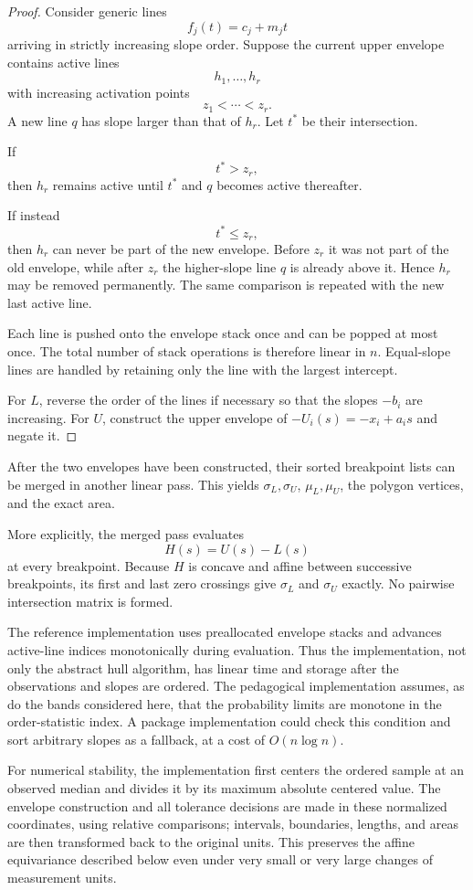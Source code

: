 \documentclass[11pt]{article}
\begin{document}
\begin{proof}
Consider generic lines
\[
    f_j(t)=c_j+m_jt
\]
arriving in strictly increasing slope order.  Suppose the current upper
envelope contains active lines
\[
    h_1,\ldots,h_r
\]
with increasing activation points
\[
    z_1<\cdots<z_r.
\]
A new line $q$ has slope larger than that of $h_r$.  Let $t^\ast$ be
their intersection.

If
\[
    t^\ast>z_r,
\]
then $h_r$ remains active until $t^\ast$ and $q$ becomes active
thereafter.

If instead
\[
    t^\ast\leq z_r,
\]
then $h_r$ can never be part of the new envelope.  Before $z_r$ it was
not part of the old envelope, while after $z_r$ the higher-slope line
$q$ is already above it.  Hence $h_r$ may be removed permanently.  The
same comparison is repeated with the new last active line.

Each line is pushed onto the envelope stack once and can be popped at
most once.  The total number of stack operations is therefore linear in
$n$.  Equal-slope lines are handled by retaining only the line with the
largest intercept.

For $L$, reverse the order of the lines if necessary so that the slopes
$-b_i$ are increasing.  For $U$, construct the upper envelope of
$-U_i(s)=-x_i+a_i s$ and negate it.
\end{proof}

After the two envelopes have been constructed, their sorted breakpoint
lists can be merged in another linear pass.  This yields
$\sigma_L,\sigma_U$, $\mu_L,\mu_U$, the polygon vertices, and the exact
area.

More explicitly, the merged pass evaluates
\[
    H(s)=U(s)-L(s)
\]
at every breakpoint.  Because $H$ is concave and affine between
successive breakpoints, its first and last zero crossings give
$\sigma_L$ and $\sigma_U$ exactly.  No pairwise intersection matrix is
formed.

The reference implementation uses preallocated envelope stacks and
advances active-line indices monotonically during evaluation.  Thus the
implementation, not only the abstract hull algorithm, has linear time
and storage after the observations and slopes are ordered.  The
pedagogical implementation assumes, as do the bands considered here,
that the probability limits are monotone in the order-statistic index.
A package implementation could check this condition and sort arbitrary
slopes as a fallback, at a cost of $O(n\log n)$.

For numerical stability, the implementation first centers the ordered
sample at an observed median and divides it by its maximum absolute
centered value.  The envelope construction and all tolerance decisions
are made in these normalized coordinates, using relative comparisons;
intervals, boundaries, lengths, and areas are then transformed back to
the original units.  This preserves the affine equivariance described
below even under very small or very large changes of measurement units.
\end{document}
